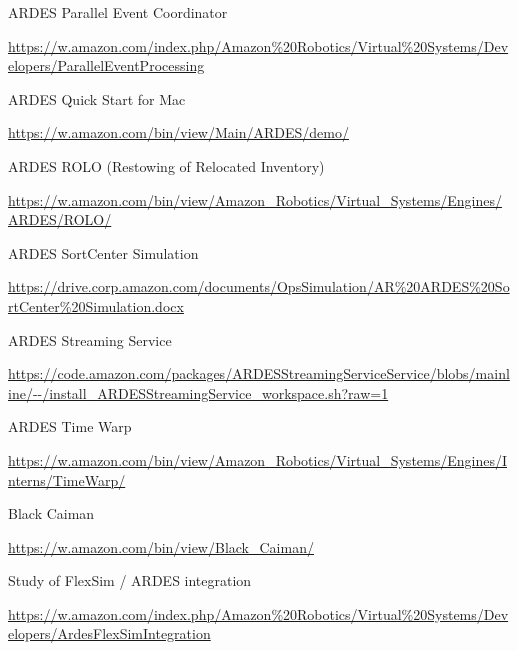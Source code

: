 \documentclass[10pt,oneside,x11names]{article}
\begin{document}
\begin{description}
\item[{ARDES Parallel Event Coordinator}] \mbox{}
\end{description}
\url{https://w.amazon.com/index.php/Amazon\%20Robotics/Virtual\%20Systems/Developers/ParallelEventProcessing}

\begin{description}
\item[{ARDES Quick Start for Mac}] \mbox{}
\end{description}
\url{https://w.amazon.com/bin/view/Main/ARDES/demo/}

\begin{description}
\item[{ARDES ROLO (Restowing of Relocated Inventory)}] \mbox{}
\end{description}
\url{https://w.amazon.com/bin/view/Amazon\_Robotics/Virtual\_Systems/Engines/ARDES/ROLO/}

\begin{description}
\item[{ARDES SortCenter Simulation}] \mbox{}
\end{description}
\url{https://drive.corp.amazon.com/documents/OpsSimulation/AR\%20ARDES\%20SortCenter\%20Simulation.docx}

\begin{description}
\item[{ARDES Streaming Service}] \mbox{}
\end{description}
\url{https://code.amazon.com/packages/ARDESStreamingServiceService/blobs/mainline/--/install\_ARDESStreamingService\_workspace.sh?raw=1}

\begin{description}
\item[{ARDES Time Warp}] \mbox{}
\end{description}
\url{https://w.amazon.com/bin/view/Amazon\_Robotics/Virtual\_Systems/Engines/Interns/TimeWarp/}

\begin{description}
\item[{Black Caiman}] \mbox{}
\end{description}
\url{https://w.amazon.com/bin/view/Black\_Caiman/}

\begin{description}
\item[{Study of FlexSim / ARDES integration}] \mbox{}
\end{description}
\url{https://w.amazon.com/index.php/Amazon\%20Robotics/Virtual\%20Systems/Developers/ArdesFlexSimIntegration}
\end{document}
